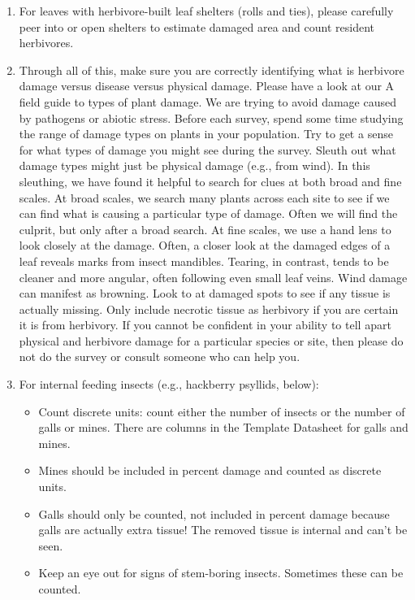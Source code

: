 \documentclass[
  letterpaper,
  DIV=11,
  numbers=noendperiod]{scrreprt}
\begin{document}
\begin{enumerate}
\def\labelenumi{\arabic{enumi}.}
\setcounter{enumi}{9}
\item
  For leaves with herbivore-built leaf shelters (rolls and ties), please
  carefully peer into or open shelters to estimate damaged area and
  count resident herbivores.
\item
  Through all of this, make sure you are correctly identifying what is
  herbivore damage versus disease versus physical damage. Please have a
  look at our A field guide to types of plant damage. We are trying to
  avoid damage caused by pathogens or abiotic stress. Before each
  survey, spend some time studying the range of damage types on plants
  in your population. Try to get a sense for what types of damage you
  might see during the survey. Sleuth out what damage types might just
  be physical damage (e.g., from wind). In this sleuthing, we have found
  it helpful to search for clues at both broad and fine scales. At broad
  scales, we search many plants across each site to see if we can find
  what is causing a particular type of damage. Often we will find the
  culprit, but only after a broad search. At fine scales, we use a hand
  lens to look closely at the damage. Often, a closer look at the
  damaged edges of a leaf reveals marks from insect mandibles. Tearing,
  in contrast, tends to be cleaner and more angular, often following
  even small leaf veins. Wind damage can manifest as browning. Look to
  at damaged spots to see if any tissue is actually missing. Only
  include necrotic tissue as herbivory if you are certain it is from
  herbivory. If you cannot be confident in your ability to tell apart
  physical and herbivore damage for a particular species or site, then
  please do not do the survey or consult someone who can help you.
\item
  For internal feeding insects (e.g., hackberry psyllids, below):

  \begin{itemize}
  \item
    Count discrete units: count either the number of insects or the
    number of galls or mines. There are columns in the Template
    Datasheet for galls and mines.
  \item
    Mines should be included in percent damage and counted as discrete
    units.
  \item
    Galls should only be counted, not included in percent damage because
    galls are actually extra tissue! The removed tissue is internal and
    can't be seen.
  \item
    Keep an eye out for signs of stem-boring insects. Sometimes these
    can be counted.
  \end{itemize}
\end{enumerate}
\end{document}
